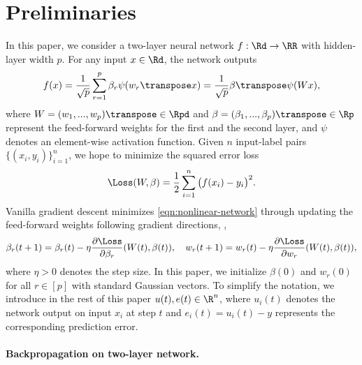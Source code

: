 \section{Preliminaries}

In this paper, we consider a two-layer neural network $f:\Rd \to \RR$ with hidden-layer width $p$. For any input $x\in\Rd$, the network outputs
\begin{align}\label{eqn:nonlinear-network}
    f(x) = \frac{1}{\sqrt p}\sum_{r=1}^p\beta_r\psi(w_r\transpose x)= \frac{1}{\sqrt p}\beta\transpose\psi(Wx),
\end{align}
where $W = (w_1,...,w_p)\transpose\in\Rpd$ and $\beta = (\beta_1,...,\beta_p)\transpose\in\Rp$ represent the feed-forward weights for the first and the second layer, and $\psi$ denotes an element-wise activation function.
Given $n$ input-label pairs $\{(x_i,y_i)\}_{i=1}^n$, we hope to minimize the squared error loss
\begin{equation}\label{eqn:squared-loss}
    \Loss(W,\beta) = \frac{1}{2}\sum_{i=1}^n \big(f(x_i)-y_i\big)^2.
\end{equation}
Vanilla gradient descent minimizes \eqref{eqn:nonlinear-network} through updating the feed-forward weights following gradient directions, \ie,
\begin{align*}
    \beta_r(t+1) = \beta_r(t)-\eta\frac{\partial\Loss}{\partial \beta_r}(W(t),\beta(t)), \quad w_r(t+1) = w_r(t)-\eta\frac{\partial\Loss}{\partial w_r}(W(t),\beta(t)),
\end{align*}
where $\eta>0$ denotes the step size. In this paper, we initialize $\beta(0)$ and $w_r(0)$ for all $r\in[p]$ with standard Gaussian vectors. To simplify the notation, we introduce in the rest of this paper $u(t),e(t)\in \R^n$, where $u_i(t)$ denotes the network output on input $x_i$ at step $t$ and $e_i(t) = u_i(t)-y$ represents the corresponding prediction error.

\paragraph{Backpropagation on two-layer network.}

